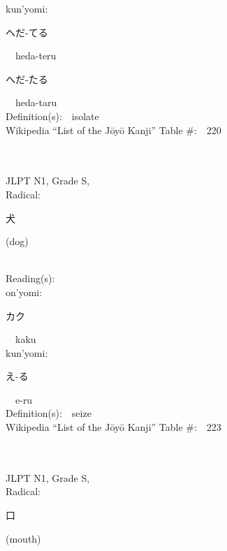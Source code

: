 \begin{multicols}{2}
{\hspace*{1em}}kun'yomi:\ \ \\
{\hspace*{2em}}{\begin{CJK}{UTF8}{min} へだ-てる \end{CJK}}\ \ heda-teru\ \ \\
{\hspace*{2em}}{\begin{CJK}{UTF8}{min} へだ-たる \end{CJK}}\ \ heda-taru\ \ \\
Definition(s):\ \ isolate \\
Wikipedia ``List of the J\=oy\=o Kanji'' Table \#:\ \ 220 \\
\ \ \\
{\fontsize{34pt}{40pt}  }\ \ \\
{JLPT N1, Grade S, \\Radical:\ \ {\begin{CJK}{UTF8}{min} 犬 \end{CJK}} (dog) } \\
Reading(s):\ \ \\
{\hspace*{1em}}on'yomi:\ \ \\
{\hspace*{2em}}{\begin{CJK}{UTF8}{min} カク \end{CJK}}\ \ kaku\ \ \\
{\hspace*{1em}}kun'yomi:\ \ \\
{\hspace*{2em}}{\begin{CJK}{UTF8}{min} え-る \end{CJK}}\ \ e-ru\ \ \\
Definition(s):\ \ seize \\
Wikipedia ``List of the J\=oy\=o Kanji'' Table \#:\ \ 223 \\
\ \ \\
{\fontsize{34pt}{40pt}  }\ \ \\
{JLPT N1, Grade S, \\Radical:\ \ {\begin{CJK}{UTF8}{min} 口 \end{CJK}} (mouth) } \\

\end{multicols}

